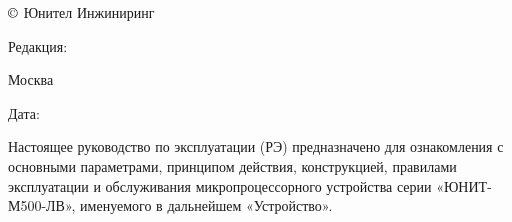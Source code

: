 \pagestyle{fancy}
\fancyhf{}
\renewcommand{\headrulewidth}{1pt}
\lhead{\color{black}{ЮТКБ.656122.611-03.01 РЭ}}
\chead{\color{black}{Редакция \rev~от~\revdate}}
\rhead{\color{unidarkgreen}\colondevicetype}
\lfoot{\color{unidarkgreen}{Руководство по эксплуатации }}
\rfoot{{\thepage}}
\renewcommand{\footrulewidth}{1pt}

\pagecolor{white}

\noindent
$\copyright$ \the\year{} Юнител Инжиниринг
\hfill
\parbox{0.3\textwidth}{\raggedleft Редакция: \textcolor{unigray}{\rev}}

\vskip 3mm
\noindent
Москва
\hfill
\parbox{0.3\textwidth}{\raggedleft Дата: \textcolor{unigray}{\revdate}}
\vskip 5mm

\par
Настоящее руководство по эксплуатации (РЭ) предназначено для ознакомления с основными параметрами, принципом действия, конструкцией, правилами эксплуатации и обслуживания микропроцессорного устройства серии «ЮНИТ-М500-ЛВ», именуемого в дальнейшем «Устройство».


